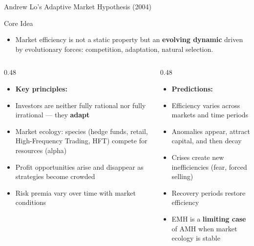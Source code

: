 \documentclass[9pt, aspectratio=169, t]{beamer}
\theoremstyle{definition}
\newenvironment{cminipage}[1]{%
    \par\noindent\hfill\begin{minipage}{#1}\ignorespaces
}{%
    \end{minipage}\hfill\null\par
}
\begin{document}
\begin{frame}{Andrew Lo's Adaptive Market Hypothesis (2004)}
\begin{cminipage}{0.95\textwidth}
\begin{block}{Core Idea}
\begin{itemize}\setlength{\itemsep}{0pt}
    \item Market efficiency is not a static property but an \textbf{evolving dynamic} driven by evolutionary forces: competition, adaptation, natural selection.
\end{itemize}
\end{block}

\begin{columns}[T]
\begin{column}{0.48\textwidth}
\begin{itemize}\setlength{\itemsep}{0pt}
    \item \textbf{Key principles:}
    \item Investors are neither fully rational nor fully irrational --- they \textbf{adapt}
    \item Market ecology: species (hedge funds, retail, High-Frequency Trading, HFT) compete for resources (alpha)
    \item Profit opportunities arise and disappear as strategies become crowded
    \item Risk premia vary over time with market conditions
\end{itemize}
\end{column}
\begin{column}{0.48\textwidth}
\begin{itemize}\setlength{\itemsep}{0pt}
    \item \textbf{Predictions:}
    \item Efficiency varies across markets and time periods
    \item Anomalies appear, attract capital, and then decay
    \item Crises create new inefficiencies (fear, forced selling)
    \item Recovery periods restore efficiency
    \item EMH is a \textbf{limiting case} of AMH when market ecology is stable
\end{itemize}
\end{column}
\end{columns}
\end{cminipage}
\end{frame}
\end{document}
